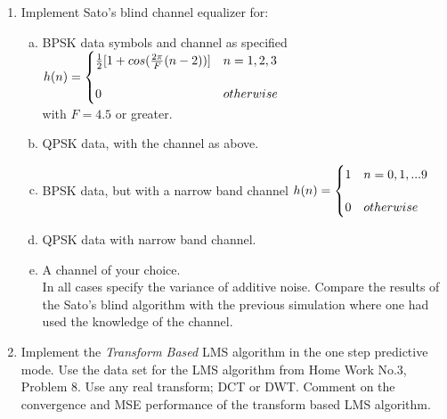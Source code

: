 \documentclass[journal,12pt,twocolumn]{IEEEtran}
\begin{document}
\section{}
\begin{enumerate}
\item Implement Sato’s blind channel equalizer for:
\medskip
\begin{enumerate}[(a)]
\item BPSK data symbols and channel as specified\\
\bigskip
$h(n)=\begin{cases}
\bigskip
\frac{1}{2}[1+cos(\frac{2\pi}{F}{(n-2)})]& n=1,2,3\\
0 & otherwise
\end{cases}$\\
with $F=4.5$ or greater.
\item QPSK data, with the channel as above.
\item BPSK data, but with a narrow band channel
$h(n)=\begin{cases}
\bigskip
{1}&  n=0,1,... 9\\
0&  otherwise
\end{cases}$\\
\medskip
\item QPSK data with narrow band channel.
\item A channel of your choice.\\
In all cases specify the variance of additive noise.
\medskip
Compare the results of the Sato’s blind algorithm with the previous simulation where one had used the knowledge
of the channel.\\
\end{enumerate}
\medskip
\item Implement the \textit{Transform Based} LMS algorithm in the one step predictive mode. Use the data set for the LMS
algorithm from Home Work No.3, Problem 8. Use any real transform; DCT or DWT. Comment on the convergence
and MSE performance of the transform based LMS algorithm.
\end{enumerate}
%
\end{document}
